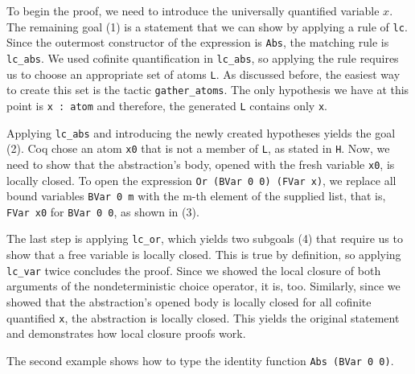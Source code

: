 \documentclass[a4paper, 11pt, fleqn]{scrreprt}
\newcommand{\coqinline}[1]{\texttt{#1}}
\begin{document}
	To begin the proof, we need to introduce the universally quantified variable $x$. The remaining goal (1) is a statement that we can show by applying a rule of \coqinline{lc}. Since the outermost constructor of the expression is \coqinline{Abs}, the matching rule is \coqinline{lc_abs}. We used cofinite quantification in \coqinline{lc_abs}, so applying the rule requires us to choose an appropriate set of atoms \coqinline{L}. As discussed before, the easiest way to create this set is the tactic \coqinline{gather_atoms}. The only hypothesis we have at this point is \coqinline{x : atom} and therefore, the generated \coqinline{L} contains only \coqinline{x}.
	\par
	Applying \coqinline{lc_abs} and introducing the newly created hypotheses yields the goal (2). Coq chose an atom \coqinline{x0} that is not a member of \coqinline{L}, as stated in \coqinline{H}. Now, we need to show that the abstraction's body, opened with the fresh variable \coqinline{x0}, is locally closed. To open the expression \coqinline{Or (BVar 0 0) (FVar x)}, we replace all bound variables \coqinline{BVar 0 m} with the m-th element of the supplied list, that is, \coqinline{FVar x0} for \coqinline{BVar 0 0}, as shown in (3).
	\par
	The last step is applying \coqinline{lc_or}, which yields two subgoals (4) that require us to show that a free variable is locally closed. This is true by definition, so applying \coqinline{lc_var} twice concludes the proof. Since we showed the local closure of both arguments of the nondeterministic choice operator, it is, too. Similarly, since we showed that the abstraction's opened body is locally closed for all cofinite quantified \coqinline{x}, the abstraction is locally closed. This yields the original statement and demonstrates how local closure proofs work. \\
	\par \noindent
	The second example shows how to type the identity function \coqinline{Abs (BVar 0 0)}.
\end{document}
